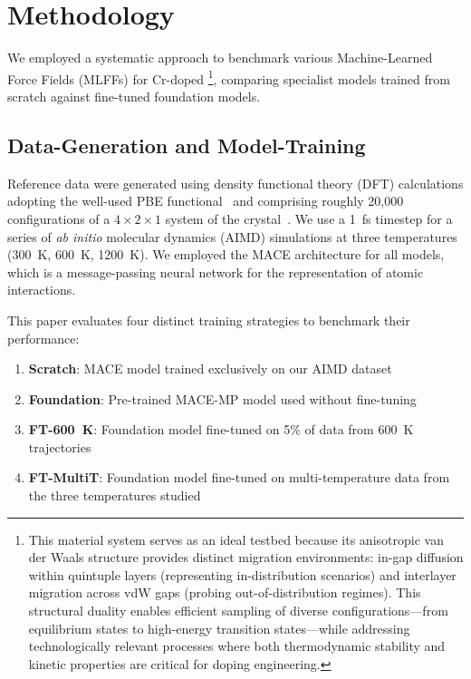 \documentclass[pdflatex,sn-mathphys-num]{sn-jnl}%
\theoremstyle{thmstyleone}%
\theoremstyle{thmstyletwo}%
\theoremstyle{thmstylethree}%
\begin{document}
\section{Methodology}
We employed a systematic approach to benchmark various Machine-Learned Force Fields (MLFFs) for Cr-doped \footnote{This material system serves as an ideal testbed because its anisotropic van der Waals structure provides distinct migration environments: in-gap diffusion within quintuple layers (representing in-distribution scenarios) and interlayer migration across vdW gaps (probing out-of-distribution regimes). This structural duality enables efficient sampling of diverse configurations—from equilibrium states to high-energy transition states—while addressing technologically relevant processes where both thermodynamic stability and kinetic properties are critical for doping engineering.}, 
comparing specialist models trained from scratch against fine-tuned foundation models. 

\subsection{Data-Generation and Model-Training}
Reference data were generated using density functional theory (DFT) calculations adopting the well-used PBE functional~\citep{perdew_generalized_1996} and comprising roughly 20,000 configurations of a $4\times 2 \times 1$ system of the  crystal~\citep{jain2013commentary}. We use a  1~fs timestep  
for a series of \textit{ab initio} molecular dynamics (AIMD) simulations at three temperatures (300~K, 600~K, 1200~K). We employed the MACE architecture for all models, which is a message-passing neural network for the representation of atomic interactions.~\cite{batatia_mace_nodate} 


This paper evaluates four distinct training strategies to benchmark their performance:
\begin{enumerate}
\item \textbf{Scratch}: MACE model trained exclusively on our AIMD dataset
\item \textbf{Foundation}: Pre-trained MACE-MP model used without fine-tuning
\item \textbf{FT-600~K}: Foundation model fine-tuned on 5\% of data from 600~K trajectories
\item \textbf{FT-MultiT}: Foundation model fine-tuned on multi-temperature data from the three temperatures studied
\end{enumerate}
\end{document}
